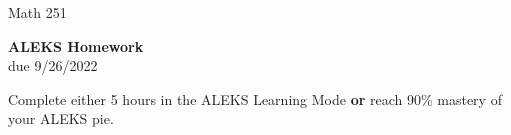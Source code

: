 \documentclass[11pt]{report}
\theoremstyle{plain}
\begin{document}
\hfill Math 251


\begin{center}
\Large{\textbf{ALEKS Homework}} \\
due 9/26/2022
\end{center}
Complete either 5 hours in the ALEKS Learning Mode \textbf{or} reach 90\% mastery of your ALEKS pie.
\end{document}
